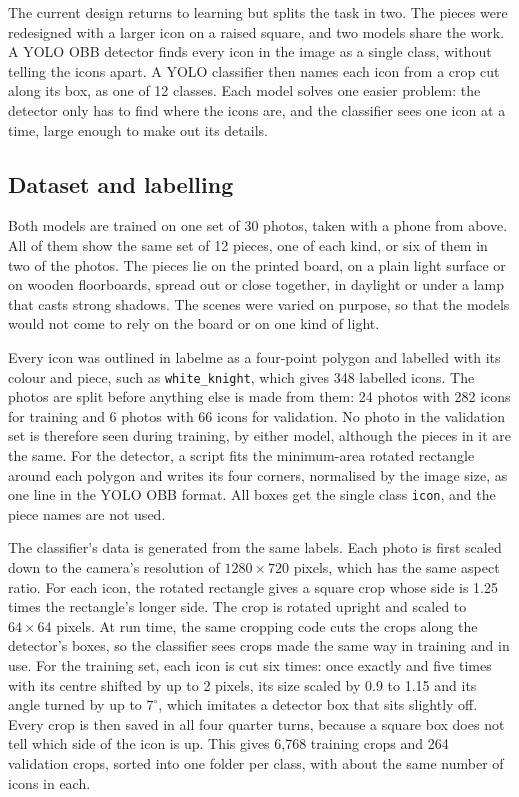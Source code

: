 The current design returns to learning but splits the task in two.
The pieces were redesigned with a larger icon on a raised square, and two models share the work.
A \ac{YOLO} \ac{OBB} detector finds every icon in the image as a single class, without telling the icons apart.
A \ac{YOLO} classifier then names each icon from a crop cut along its box, as one of 12 classes.
Each model solves one easier problem: the detector only has to find where the icons are, and the classifier sees one icon at a time, large enough to make out its details.

\subsection{Dataset and labelling}
\label{subsec:dataset}

Both models are trained on one set of 30 photos, taken with a phone from above.
All of them show the same set of 12 pieces, one of each kind, or six of them in two of the photos.
The pieces lie on the printed board, on a plain light surface or on wooden floorboards, spread out or close together, in daylight or under a lamp that casts strong shadows.
The scenes were varied on purpose, so that the models would not come to rely on the board or on one kind of light.

Every icon was outlined in labelme \cite{labelme} as a four-point polygon and labelled with its colour and piece, such as \texttt{white\_knight}, which gives 348 labelled icons.
The photos are split before anything else is made from them: 24 photos with 282 icons for training and 6 photos with 66 icons for validation.
No photo in the validation set is therefore seen during training, by either model, although the pieces in it are the same.
For the detector, a script fits the minimum-area rotated rectangle around each polygon and writes its four corners, normalised by the image size, as one line in the \ac{YOLO} \ac{OBB} format.
All boxes get the single class \texttt{icon}, and the piece names are not used.

The classifier's data is generated from the same labels.
Each photo is first scaled down to the camera's resolution of $1280 \times 720$ pixels, which has the same aspect ratio.
For each icon, the rotated rectangle gives a square crop whose side is 1.25 times the rectangle's longer side.
The crop is rotated upright and scaled to $64 \times 64$ pixels.
At run time, the same cropping code cuts the crops along the detector's boxes, so the classifier sees crops made the same way in training and in use.
For the training set, each icon is cut six times: once exactly and five times with its centre shifted by up to 2 pixels, its size scaled by 0.9 to 1.15 and its angle turned by up to $7^\circ$, which imitates a detector box that sits slightly off.
Every crop is then saved in all four quarter turns, because a square box does not tell which side of the icon is up.
This gives 6,768 training crops and 264 validation crops, sorted into one folder per class, with about the same number of icons in each.

